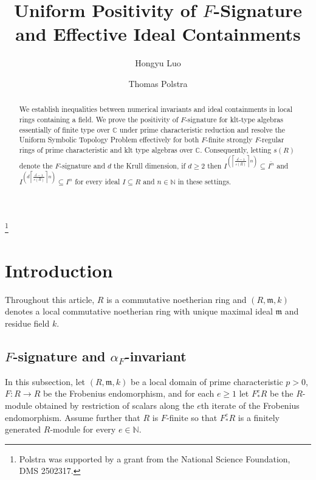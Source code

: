 \documentclass[12pt]{amsart}
\numberwithin{equation}{theorem}
\theoremstyle{plain}
\newcommand{\fm}{\mathfrak{m}}
\newcommand{\NN}{\mathbb{N}}
\begin{document}
\title{Uniform Positivity of $F$-Signature and Effective Ideal Containments}

\author{Hongyu Luo}
\address{Department of Mathematics, University of Alabama, Tuscaloosa, AL 35487 USA}



\author{Thomas Polstra}
\address{Department of Mathematics, University of Alabama, Tuscaloosa, AL 35487 USA}
\thanks{Polstra was supported by a grant from the National Science Foundation, DMS 2502317.}

\begin{abstract}
We establish inequalities between numerical invariants and ideal containments in local rings containing a field. We prove the positivity of $F$-signature for klt-type algebras essentially of finite type over $\mathbb{C}$ under prime characteristic reduction and resolve the Uniform Symbolic Topology Problem effectively for both $F$-finite strongly $F$-regular rings of prime characteristic and klt type algebras over $\mathbb{C}$. Consequently, letting $s(R)$ denote the $F$-signature and $d$ the Krull dimension, if $d\geq 2$ then $I^{\left(\left\lceil\frac{d-1}{s(R)}\right\rceil n\right)} \subseteq \overline{I^{n}}$ and $I^{\left(d\left\lceil\frac{d-1}{s(R)}\right\rceil n\right)} \subseteq I^n$ for every ideal $I \subseteq R$ and $n \in \mathbb{N}$ in these settings.
\end{abstract}

\maketitle



\section{Introduction}

Throughout this article, $R$ is a commutative noetherian ring and $(R,\fm,k)$ denotes a local commutative noetherian ring with unique maximal ideal $\fm$ and residue field $k$.

\subsection{$F$-signature and $\alpha_F$-invariant}

In this subsection, let $(R,\fm,k)$ be a local domain of prime characteristic $p>0$, $F:R\to R$ be the Frobenius endomorphism, and for each $e\geq 1$ let $F^e_*R$ be the $R$-module obtained by restriction of scalars along the $e$th iterate of the Frobenius endomorphism. Assume further that $R$ is $F$-finite so that $F^e_*R$ is a finitely generated $R$-module for every $e\in\NN$.
\end{document}
